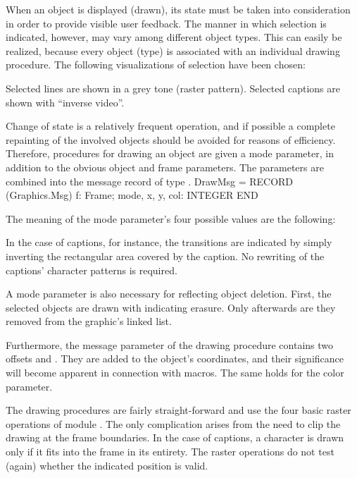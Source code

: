When an object is displayed (drawn), its state must be taken into consideration in order to provide visible user feedback. The manner in which selection is indicated, however, may vary among different object types. This can easily be realized, because every object (type) is associated with an individual drawing procedure. The following visualizations of selection have been chosen:

Selected lines are shown in a grey tone (raster pattern). Selected captions are shown with ``inverse video''.

Change of state is a relatively frequent operation, and if possible a complete repainting of the involved objects should be avoided for reasons of efficiency. Therefore, procedures for drawing an object are given a mode parameter, in addition to the obvious object and frame parameters. The parameters are combined into the message record of type .
\begintt
DrawMsg = RECORD (Graphics.Msg)
  f: Frame;
  mode, x, y, col: INTEGER
END
\endtt

The meaning of the mode parameter's four possible values are the following:


In the case of captions, for instance, the transitions are indicated by simply inverting the rectangular area covered by the caption. No rewriting of the captions' character patterns is required.

A mode parameter is also necessary for reflecting object deletion. First, the selected objects are drawn with  indicating erasure. Only afterwards are they removed from the graphic's linked list.

Furthermore, the message parameter of the drawing procedure contains two offsets  and . They are added to the object's coordinates, and their significance will become apparent in connection with macros. The same holds for the color parameter.

The drawing procedures are fairly straight-forward and use the four basic raster operations of module . The only complication arises from the need to clip the drawing at the frame boundaries. In the case of captions, a character is drawn only if it fits into the frame in its entirety. The raster operations do not test (again) whether the indicated position is valid.

